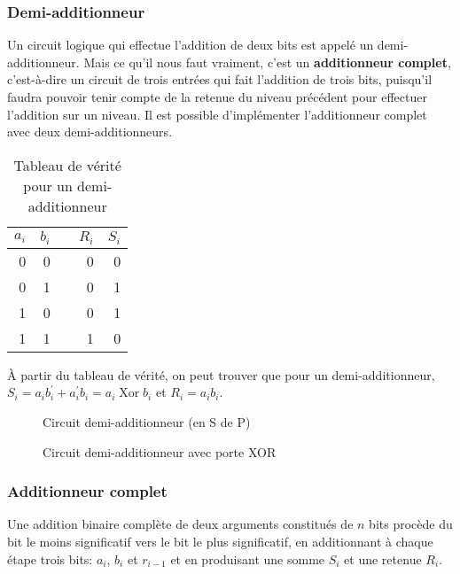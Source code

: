 \documentclass[11pt]{article}
\begin{document}
\subsubsection{Demi-additionneur}
\label{sec:org8f3cfd6}

Un circuit logique qui effectue l'addition de deux bits est appelé un
demi-additionneur. Mais ce qu'il nous faut vraiment, c'est un
\textbf{additionneur complet}, c'est-à-dire un circuit de trois entrées qui
fait l'addition de trois bits, puisqu'il faudra pouvoir tenir compte
de la retenue du niveau précédent pour effectuer l'addition sur un
niveau. Il est possible d'implémenter l'additionneur complet avec deux
demi-additionneurs.

\begin{table}[htbp]
\caption{\label{tab:org0224aa8}Tableau de vérité pour un demi-additionneur}
\centering
\begin{tabular}{rrlrr}
\(a_{i}\) & \(b_{i}\) &  & \(R_{i}\) & \(S_{i}\)\\[0pt]
\hline
0 & 0 &  & 0 & 0\\[0pt]
0 & 1 &  & 0 & 1\\[0pt]
1 & 0 &  & 0 & 1\\[0pt]
1 & 1 &  & 1 & 0\\[0pt]
\end{tabular}
\end{table}


À partir du tableau de vérité, on peut trouver que pour un
demi-additionneur, \(S_{i} = a_i b_i^\prime + a_i^\prime b_i = a_i
\operatorname{Xor} b_i\) et \(R_{i} = a_i b_i\).

\begin{figure}[htbp]
\centering

\caption{\label{fig:orgc19391f}Circuit demi-additionneur (en S de P)}
\end{figure}


\begin{figure}[htbp]
\centering

\caption{\label{fig:orgbda74db}Circuit demi-additionneur avec porte XOR}
\end{figure}

\subsubsection{Additionneur complet}
\label{sec:org78fab26}

Une addition binaire complète de deux arguments constitués de \(n\)
bits procède du bit le moins significatif vers le bit le plus
significatif, en additionnant à chaque étape trois bits: \(a_{i}\),
\(b_{i}\) et \(r_{i-1}\) et en produisant une somme \(S_{i}\) et une
retenue \(R_{i}\).
\end{document}
